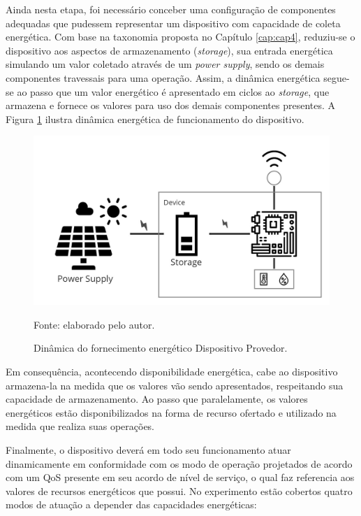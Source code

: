 Ainda nesta etapa, foi necessário conceber uma configuração de componentes adequadas que pudessem representar um dispositivo com capacidade de coleta energética. Com base na taxonomia proposta no Capítulo \ref{cap:cap4}, reduziu-se o dispositivo aos aspectos de armazenamento (\textit{storage}), sua entrada energética simulando um valor coletado através de um \textit{power supply}, sendo os demais componentes travessais para uma operação. Assim, a dinâmica energética segue-se ao passo que um valor energético é apresentado em ciclos ao \textit{storage}, que armazena e fornece os valores para uso dos demais componentes presentes. A Figura \ref{fig:cap6dinamica} ilustra dinâmica energética de funcionamento do dispositivo.

\begin{figure}[H]
	\centering
	
	\caption{Dinâmica do fornecimento energético Dispositivo Provedor.}
	\label{fig:cap6dinamica}
	\noindent\includegraphics[width=0.75\linewidth]{Imagens/cap6/cap6dinamica.jpg} 
		
	Fonte: elaborado pelo autor.
\end{figure}


Em consequência, acontecendo disponibilidade energética, cabe ao dispositivo armazena-la na medida que os valores vão sendo apresentados, respeitando sua capacidade de armazenamento. Ao passo que paralelamente, os valores energéticos estão disponibilizados na forma de recurso ofertado e utilizado na medida que realiza suas operações.

Finalmente, o dispositivo deverá em todo seu funcionamento atuar dinamicamente em conformidade com os modo de operação projetados de acordo com um \acs{QoS} presente em seu acordo de nível de serviço, o qual faz referencia aos valores de recursos energéticos que possui. No experimento estão cobertos quatro modos de atuação a depender das capacidades energéticas:


